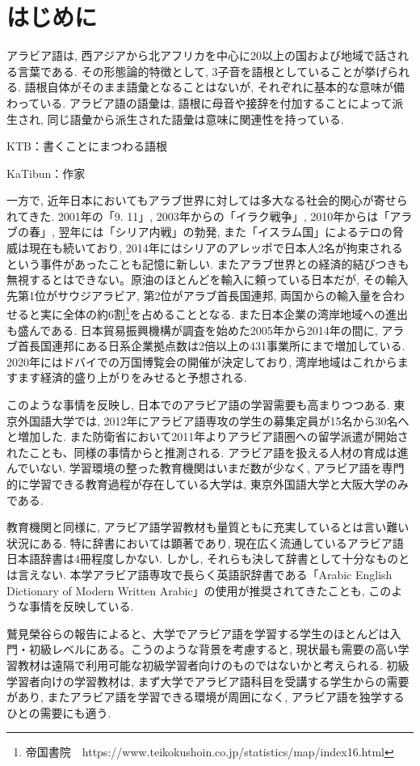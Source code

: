 \documentclass[technicalreport]{ieicej}
\begin{document}
\section{はじめに}
アラビア語は, 西アジアから北アフリカを中心に20以上の国および地域で話される言葉である. その形態論的特徴として, 3子音を語根としていることが挙げられる. 語根自体がそのまま語彙となることはないが, それぞれに基本的な意味が備わっている. アラビア語の語彙は, 語根に母音や接辞を付加することによって派生され, 同じ語彙から派生された語彙は意味に関連性を持っている.

KTB：書くことにまつわる語根

KaTibun：作家

一方で, 近年日本においてもアラブ世界に対しては多大なる社会的関心が寄せられてきた. 2001年の「9. 11」, 2003年からの「イラク戦争」, 2010年からは「アラブの春」, 翌年には「シリア内戦」の勃発, また「イスラム国」によるテロの脅威は現在も続いており, 2014年にはシリアのアレッポで日本人2名が拘束されるという事件があったことも記憶に新しい. またアラブ世界との経済的結びつきも無視するとはできない。原油のほとんどを輸入に頼っている日本だが, その輸入先第1位がサウジアラビア, 第2位がアラブ首長国連邦, 両国からの輸入量を合わせると実に全体の約6割\footnote{帝国書院　https://www.teikokushoin.co.jp/statistics/map/index16.html}を占めることとなる. また日本企業の湾岸地域への進出も盛んである. 日本貿易振興機構が調査を始めた2005年から2014年の間に, アラブ首長国連邦にある日系企業拠点数は2倍以上の431事業所にまで増加している. 2020年にはドバイでの万国博覧会の開催が決定しており, 湾岸地域はこれからますます経済的盛り上がりをみせると予想される. 

このような事情を反映し, 日本でのアラビア語の学習需要も高まりつつある. 東京外国語大学では, 2012年にアラビア語専攻の学生の募集定員が15名から30名へと増加した. また防衛省において2011年よりアラビア語圏への留学派遣が開始されたことも、同様の事情からと推測される. アラビア語を扱える人材の育成は進んでいない. 学習環境の整った教育機関はいまだ数が少なく, アラビア語を専門的に学習できる教育過程が存在している大学は, 東京外国語大学と大阪大学のみである. 

教育機関と同様に, アラビア語学習教材も量質ともに充実しているとは言い難い状況にある. 特に辞書においては顕著であり, 現在広く流通しているアラビア語日本語辞書は4冊程度しかない. しかし, それらも決して辞書として十分なものとは言えない. 本学アラビア語専攻で長らく英語訳辞書である「Arabic English Dictionary of Modern Written Arabic」の使用が推奨されてきたことも, このような事情を反映している.

鷲見榮谷\cite{washimi2016}らの報告によると、大学でアラビア語を学習する学生のほとんどは入門・初級レベルにある。こうのような背景を考慮すると, 現状最も需要の高い学習教材は遠隔で利用可能な初級学習者向けのものではないかと考えられる. 初級学習者向けの学習教材は, まず大学でアラビア語科目を受講する学生からの需要があり, またアラビア語を学習できる環境が周囲になく, アラビア語を独学するひとの需要にも適う.
\end{document}
